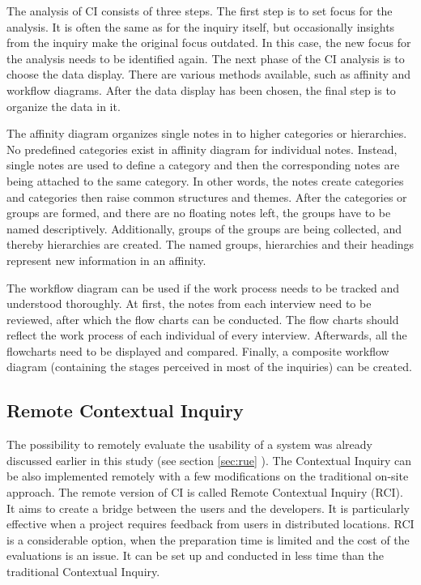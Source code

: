 \documentclass[12pt,a4paper,oneside,pdftex]{report}
\begin{document}
The analysis of CI consists of three steps. The first step is to set focus for the analysis. It is often the same as for the inquiry itself, but occasionally insights from the inquiry make the original focus outdated. In this case, the new focus for the analysis needs to be identified again. The next phase of the CI analysis is to choose the data display. There are various methods available, such as affinity and workflow diagrams. After the data display has been chosen, the final step is to organize the data in it. \citep{RefWorks:28}

The affinity diagram organizes single notes in to higher categories or hierarchies. No predefined categories exist in affinity diagram for individual notes. Instead, single notes are used to define a category and then the corresponding notes are being attached to the same category. In other words, the notes create categories and categories then raise common structures and themes. After the categories or groups are formed, and there are no floating notes left, the groups have to be named descriptively. Additionally, groups of the groups are being collected, and thereby hierarchies are created. The named groups, hierarchies and their headings represent new information in an affinity. \citep{RefWorks:21, RefWorks:28}

The workflow diagram can be used if the work process needs to be tracked and understood thoroughly. At first, the notes from each interview need to be reviewed, after which the flow charts can be conducted. The flow charts should reflect the work process of each individual of every interview. Afterwards, all the flowcharts need to be displayed and compared. Finally, a composite workflow diagram (containing the stages perceived in most of the inquiries) can be created. \citep{RefWorks:28}

\subsection{Remote Contextual Inquiry}
The possibility to remotely evaluate the usability of a system was already discussed earlier in this study (see section \ref{sec:rue} ). The Contextual Inquiry can be also implemented remotely with a few modifications on the traditional on-site approach. The remote version of CI is called Remote Contextual Inquiry (RCI). It aims to create a bridge between the users and the developers. It is particularly effective when a project requires feedback from users in distributed locations. RCI is a considerable option, when the preparation time is limited and the cost of the evaluations is an issue. It can be set up and conducted in less time than the traditional Contextual Inquiry. \citep{RefWorks:32}
\end{document}
